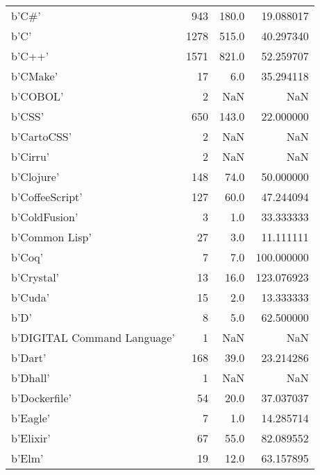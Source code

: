 \begin{table}
\begin{tabular}{lrrr}
b'C\#'                       &             943 &     180.0 &      19.088017 \\
b'C'                        &            1278 &     515.0 &      40.297340 \\
b'C++'                      &            1571 &     821.0 &      52.259707 \\
b'CMake'                    &              17 &       6.0 &      35.294118 \\
b'COBOL'                    &               2 &       NaN &            NaN \\
b'CSS'                      &             650 &     143.0 &      22.000000 \\
b'CartoCSS'                 &               2 &       NaN &            NaN \\
b'Cirru'                    &               2 &       NaN &            NaN \\
b'Clojure'                  &             148 &      74.0 &      50.000000 \\
b'CoffeeScript'             &             127 &      60.0 &      47.244094 \\
b'ColdFusion'               &               3 &       1.0 &      33.333333 \\
b'Common Lisp'              &              27 &       3.0 &      11.111111 \\
b'Coq'                      &               7 &       7.0 &     100.000000 \\
b'Crystal'                  &              13 &      16.0 &     123.076923 \\
b'Cuda'                     &              15 &       2.0 &      13.333333 \\
b'D'                        &               8 &       5.0 &      62.500000 \\
b'DIGITAL Command Language' &               1 &       NaN &            NaN \\
b'Dart'                     &             168 &      39.0 &      23.214286 \\
b'Dhall'                    &               1 &       NaN &            NaN \\
b'Dockerfile'               &              54 &      20.0 &      37.037037 \\
b'Eagle'                    &               7 &       1.0 &      14.285714 \\
b'Elixir'                   &              67 &      55.0 &      82.089552 \\
b'Elm'                      &              19 &      12.0 &      63.157895 \\

\end{tabular}
\end{table}
